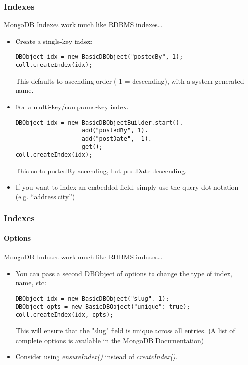 \documentclass{beamer}
\begin{document}
\begin{frame}[fragile]
\frametitle{Indexes}
    \small MongoDB Indexes work much like RDBMS indexes\ldots
    \begin{itemize}
        \item Create a single-key index:\\ 
\begin{lstlisting}
DBObject idx = new BasicDBObject("postedBy", 1);
coll.createIndex(idx);
\end{lstlisting}
        This defaults to ascending order (-1 = descending), with a system generated name.
        \item For a multi-key/compound-key index:
            \begin{lstlisting}
DBObject idx = new BasicDBObjectBuilder.start().
                   add("postedBy", 1).
                   add("postDate", -1).
                   get();
coll.createIndex(idx);
\end{lstlisting}
        This sorts postedBy ascending, but postDate descending.

    \item If you want to index an embedded field, simply use the query dot notation (e.g. ``address.city'')
        
    \end{itemize}
\end{frame}

\begin{frame}[fragile]
\frametitle{Indexes}
\framesubtitle{Options}
    \small MongoDB Indexes work much like RDBMS indexes\ldots
    \begin{itemize}
    \item You can pass a second DBObject of options to change the type of index, name, etc:
\begin{lstlisting}
DBObject idx = new BasicDBObject("slug", 1);
DBObject opts = new BasicDBObject("unique": true);
coll.createIndex(idx, opts);
\end{lstlisting}
            This will ensure that the "slug" field is unique across all entries.  (A list of complete options is available in the MongoDB Documentation)
        \item Consider using {\em ensureIndex()} instead of {\em createIndex()}.
    \end{itemize}
\end{frame}
\end{document}

